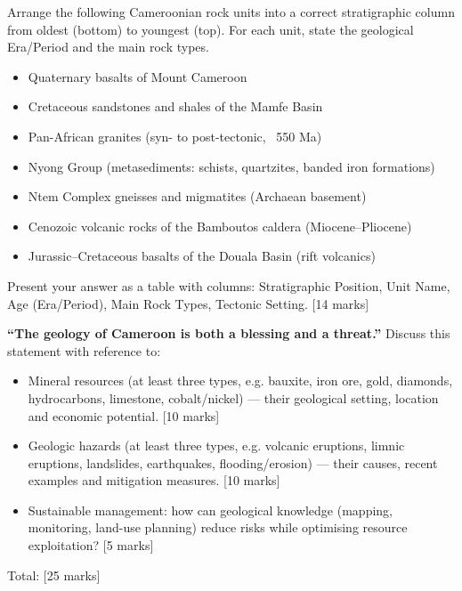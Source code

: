 \documentclass[11pt]{article}
\newcounter{popsec}
\newcounter{popsub}
\newcommand{\courssub}[1]{%
  \stepcounter{popsub}%
  \par\vspace{9pt}\noindent{\popxbold\fontsize{11.5}{13}\selectfont\color{popink}{\color{poporange}\thepopsec.\thepopsub}\hspace{6pt}#1}\par\nopagebreak\vspace{4pt}
}
\begin{document}
\begin{exercice}
Arrange the following Cameroonian rock units into a correct stratigraphic column from oldest (bottom) to youngest (top). For each unit, state the geological Era/Period and the main rock types.
\begin{itemize}
\item Quaternary basalts of Mount Cameroon
\item Cretaceous sandstones and shales of the Mamfe Basin
\item Pan-African granites (syn- to post-tectonic, ~550 Ma)
\item Nyong Group (metasediments: schists, quartzites, banded iron formations)
\item Ntem Complex gneisses and migmatites (Archaean basement)
\item Cenozoic volcanic rocks of the Bamboutos caldera (Miocene–Pliocene)
\item Jurassic–Cretaceous basalts of the Douala Basin (rift volcanics)
\end{itemize}
Present your answer as a table with columns: Stratigraphic Position, Unit Name, Age (Era/Period), Main Rock Types, Tectonic Setting. [14 marks]
\end{exercice}

\courssub{I prepare for the GCE}

\begin{exercice}
\textbf{``The geology of Cameroon is both a blessing and a threat.''} Discuss this statement with reference to:
\begin{itemize}
\item Mineral resources (at least three types, e.g. bauxite, iron ore, gold, diamonds, hydrocarbons, limestone, cobalt/nickel) — their geological setting, location and economic potential. [10 marks]
\item Geologic hazards (at least three types, e.g. volcanic eruptions, limnic eruptions, landslides, earthquakes, flooding/erosion) — their causes, recent examples and mitigation measures. [10 marks]
\item Sustainable management: how can geological knowledge (mapping, monitoring, land-use planning) reduce risks while optimising resource exploitation? [5 marks]
\end{itemize}
Total: [25 marks]
\end{exercice}
\end{document}
